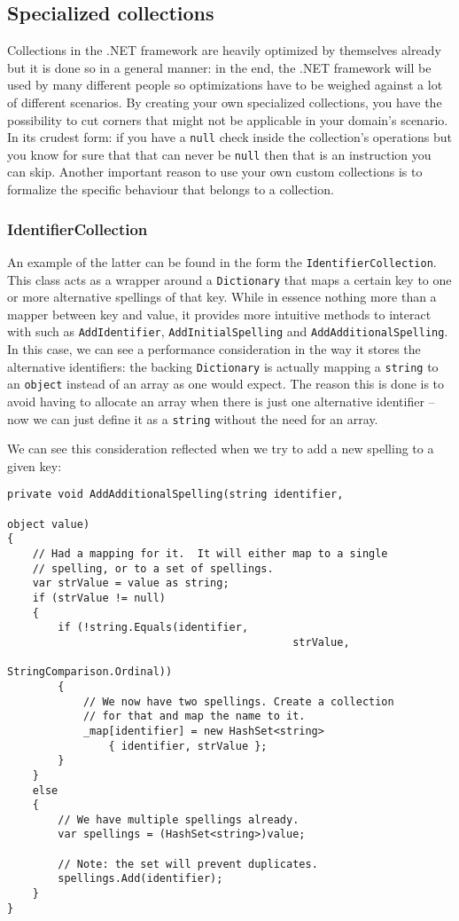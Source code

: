 \subsection{Specialized collections}
\label{sec:specialized-collections}

Collections in the .NET framework are heavily optimized by themselves already but it is done so in a general manner: in the end, the .NET framework will be used by many different people so optimizations have to be weighed against a lot of different scenarios. By creating your own specialized collections, you have the possibility to cut corners that might not be applicable in your domain's scenario. In its crudest form: if you have a \texttt{null} check inside the collection's operations but you know for sure that that can never be \texttt{null} then that is an instruction you can skip. Another important reason to use your own custom collections is to formalize the specific behaviour that belongs to a collection. 

\subsubsection{IdentifierCollection}
\label{sec:spec-coll-identifiercollection}

An example of the latter can be found in the form the \texttt{IdentifierCollection}. This class acts as a wrapper around a \texttt{Dictionary} that maps a certain key to one or more alternative spellings of that key. While in essence nothing more than a mapper between key and value, it provides more intuitive methods to interact with such as \texttt{AddIdentifier}, \texttt{AddInitialSpelling} and \texttt{AddAdditionalSpelling}.
In this case, we can see a performance consideration in the way it stores the alternative identifiers: the backing \texttt{Dictionary} is actually mapping a \texttt{string} to an \texttt{object} instead of an array as one would expect. The reason this is done is to avoid having to allocate an array when there is just one alternative identifier -- now we can just define it as a \texttt{string} without the need for an array.

We can see this consideration reflected when we try to add a new spelling to a given key:

\begin{lstlisting}
private void AddAdditionalSpelling(string identifier, 
																	 object value)
{
	// Had a mapping for it.  It will either map to a single 
	// spelling, or to a set of spellings.
	var strValue = value as string;
	if (strValue != null)
	{
		if (!string.Equals(identifier, 
											 strValue, 
											 StringComparison.Ordinal))
		{
			// We now have two spellings. Create a collection 
			// for that and map the name to it.
			_map[identifier] = new HashSet<string> 
				{ identifier, strValue };
		}
	}
	else
	{
		// We have multiple spellings already.
		var spellings = (HashSet<string>)value;

		// Note: the set will prevent duplicates.
		spellings.Add(identifier);
	}
}
\end{lstlisting}

